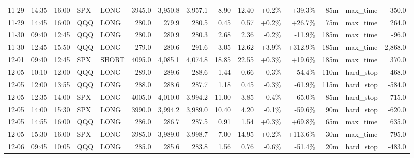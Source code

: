 \documentclass[11pt,a4paper,twoside]{article}
\begin{document}
\begin{landscape}
\begin{center}
\begin{longtable}{>{\color{txtmain}}l l l l l r r r r r r r r >{\color{txtmain}}l r}
11-29 & 14:35 & 16:00 & SPX & LONG & 3945.0 & 3,950.8 & 3,957.1 & 8.90 & 12.40 & \textcolor{wingreen}{+0.2\%} & \textcolor{wingreen}{+39.3\%} & 85m & max\_time & \textcolor{wingreen}{350.0} \\
11-29 & 14:45 & 16:00 & QQQ & LONG & 280.0 & 279.9 & 280.5 & 0.45 & 0.57 & \textcolor{wingreen}{+0.2\%} & \textcolor{wingreen}{+26.7\%} & 75m & max\_time & \textcolor{wingreen}{264.0} \\
11-30 & 09:40 & 12:45 & QQQ & LONG & 280.0 & 280.9 & 280.3 & 2.68 & 2.36 & \textcolor{lossred}{-0.2\%} & \textcolor{lossred}{-11.9\%} & 185m & max\_time & \textcolor{lossred}{-96.0} \\
11-30 & 12:45 & 15:50 & QQQ & LONG & 279.0 & 280.6 & 291.6 & 3.05 & 12.62 & \textcolor{wingreen}{+3.9\%} & \textcolor{wingreen}{+312.9\%} & 185m & max\_time & \textcolor{wingreen}{2,868.0} \\
12-01 & 09:40 & 12:45 & SPX & SHORT & 4095.0 & 4,085.1 & 4,074.8 & 18.85 & 22.55 & \textcolor{wingreen}{+0.3\%} & \textcolor{wingreen}{+19.6\%} & 185m & max\_time & \textcolor{wingreen}{370.0} \\
12-05 & 10:10 & 12:00 & QQQ & LONG & 289.0 & 289.6 & 288.6 & 1.44 & 0.66 & \textcolor{lossred}{-0.3\%} & \textcolor{lossred}{-54.4\%} & 110m & hard\_stop & \textcolor{lossred}{-468.0} \\
12-05 & 12:00 & 13:55 & QQQ & LONG & 288.0 & 288.6 & 287.7 & 1.18 & 0.45 & \textcolor{lossred}{-0.3\%} & \textcolor{lossred}{-61.9\%} & 115m & hard\_stop & \textcolor{lossred}{-584.0} \\
12-05 & 12:35 & 14:00 & SPX & LONG & 4005.0 & 4,010.0 & 3,994.2 & 11.00 & 3.85 & \textcolor{lossred}{-0.4\%} & \textcolor{lossred}{-65.0\%} & 85m & hard\_stop & \textcolor{lossred}{-715.0} \\
12-05 & 14:00 & 15:30 & SPX & LONG & 3990.0 & 3,994.2 & 3,989.0 & 10.40 & 4.20 & \textcolor{lossred}{-0.1\%} & \textcolor{lossred}{-59.6\%} & 90m & hard\_stop & \textcolor{lossred}{-620.0} \\
12-05 & 14:55 & 16:00 & QQQ & LONG & 286.0 & 286.7 & 287.5 & 0.91 & 1.54 & \textcolor{wingreen}{+0.3\%} & \textcolor{wingreen}{+69.8\%} & 65m & max\_time & \textcolor{wingreen}{635.0} \\
12-05 & 15:30 & 16:00 & SPX & LONG & 3985.0 & 3,989.0 & 3,998.7 & 7.00 & 14.95 & \textcolor{wingreen}{+0.2\%} & \textcolor{wingreen}{+113.6\%} & 30m & max\_time & \textcolor{wingreen}{795.0} \\
12-06 & 09:45 & 10:05 & QQQ & LONG & 285.0 & 285.6 & 283.8 & 1.56 & 0.76 & \textcolor{lossred}{-0.6\%} & \textcolor{lossred}{-51.4\%} & 20m & hard\_stop & \textcolor{lossred}{-483.0} \\

\end{longtable}
\end{center}
\end{landscape}
\end{document}
